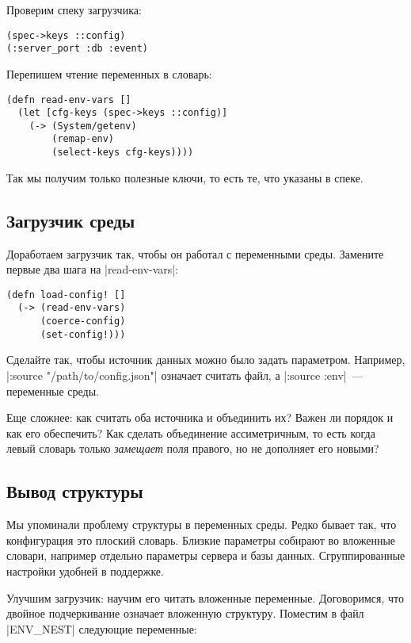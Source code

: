 \noindent
Проверим спеку загрузчика:

\begin{verbatim}
(spec->keys ::config)
(:server_port :db :event)
\end{verbatim}

\noindent
Перепишем чтение переменных в словарь:

\begin{verbatim}
(defn read-env-vars []
  (let [cfg-keys (spec->keys ::config)]
    (-> (System/getenv)
        (remap-env)
        (select-keys cfg-keys))))
\end{verbatim}

\noindent
Так мы получим только полезные ключи, то есть те, что указаны в спеке.

\subsection{Загрузчик среды}

Доработаем загрузчик так, чтобы он работал с переменными среды. Замените первые
два шага на \spverb|read-env-vars|:

\begin{verbatim}
(defn load-config! []
  (-> (read-env-vars)
      (coerce-config)
      (set-config!)))
\end{verbatim}

Сделайте так, чтобы источник данных можно было задать параметром. Например,
\spverb|:source "/path/to/config.json"| означает считать файл, а
\spverb|:source :env|~--- переменные среды.

Еще сложнее: как считать оба источника и объединить их? Важен ли порядок и как
его обеспечить? Как сделать объединение ассиметричным, то есть когда левый
словарь только \emph{замещает} поля правого, но не дополняет его новыми?

\subsection{Вывод структуры}

Мы упоминали проблему структуры в переменных среды. Редко бывает так, что
конфигурация это плоский словарь. Близкие параметры собирают во вложенные
словари, например отдельно параметры сервера и базы данных. Сгруппированные
настройки удобней в поддержке.

Улучшим загрузчик: научим его читать вложенные переменные. Договоримся, что
двойное подчеркивание означает вложенную структуру. Поместим в файл
\spverb|ENV_NEST| следующие переменные:


